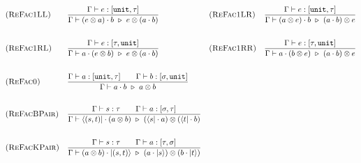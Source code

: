 \begin{align*}
  & \textsc{(ReFac1LL)} && \frac{\Gamma \vdash e : [\texttt{unit}, \tau]}{\Gamma \vdash (e \otimes a) \cdot b \ \triangleright\  e \otimes (a \cdot b)}
  && \textsc{(ReFac1LR)} && \frac{\Gamma \vdash e : [\texttt{unit}, \tau]}{\Gamma \vdash (a \otimes e) \cdot b \ \triangleright\  (a \cdot b) \otimes e} \\
  \\
  & \textsc{(ReFac1RL)} && \frac{\Gamma \vdash e : [\tau, \texttt{unit}]}{\Gamma \vdash a \cdot (e \otimes b) \ \triangleright\  e \otimes (a \cdot b)} 
  && \textsc{(ReFac1RR)} && \frac{\Gamma \vdash e : [\tau, \texttt{unit}]}{\Gamma \vdash a \cdot (b \otimes e) \ \triangleright\  (a \cdot b) \otimes e} \\
  \\
  & \textsc{(ReFac0)} && \frac{\Gamma \vdash a : [\texttt{unit}, \tau] \qquad \Gamma \vdash b : [\sigma, \texttt{unit}]}{\Gamma \vdash a \cdot b \ \triangleright\  a \otimes b} \\
  \\
  & \textsc{(ReFacBPair)} && \frac{\Gamma \vdash s : \tau \qquad \Gamma \vdash a : [\sigma, \tau]}{\Gamma \vdash \langle (s, t)| \cdot (a \otimes b) \ \triangleright\  (\langle s| \cdot a) \otimes (\langle t| \cdot b)} \\
  \\
  & \textsc{(ReFacKPair)} && \frac{\Gamma \vdash s : \tau \qquad \Gamma \vdash a : [\tau, \sigma]}{\Gamma \vdash (a \otimes b) \cdot |(s, t)\rangle  \ \triangleright\  (a \cdot |s\rangle) \otimes (b \cdot |t\rangle)}
\end{align*}



